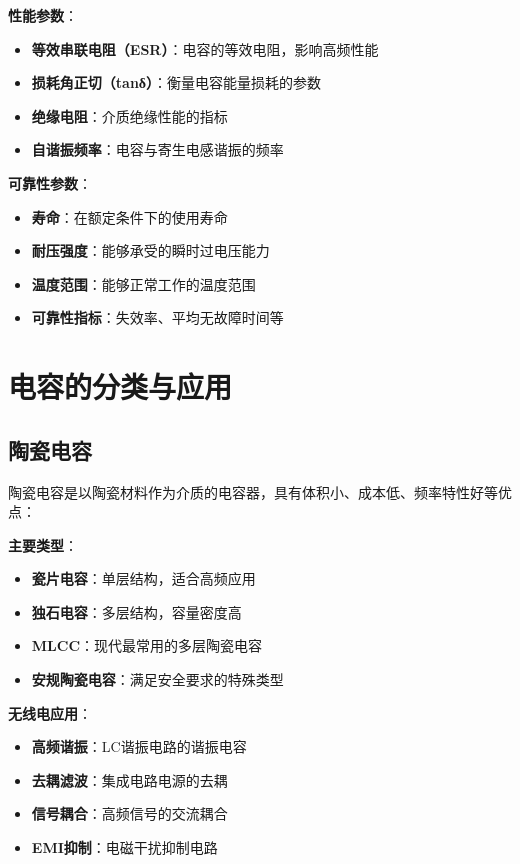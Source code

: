 \documentclass[12pt,UTF8]{ctexbook}
\begin{document}
\textbf{性能参数}：
\begin{itemize}[leftmargin=3.5em]
    \item \textbf{等效串联电阻（ESR）}：电容的等效电阻，影响高频性能
    \item \textbf{损耗角正切（tanδ）}：衡量电容能量损耗的参数
    \item \textbf{绝缘电阻}：介质绝缘性能的指标
    \item \textbf{自谐振频率}：电容与寄生电感谐振的频率
\end{itemize}

\textbf{可靠性参数}：
\begin{itemize}[leftmargin=3.5em]
    \item \textbf{寿命}：在额定条件下的使用寿命
    \item \textbf{耐压强度}：能够承受的瞬时过电压能力
    \item \textbf{温度范围}：能够正常工作的温度范围
    \item \textbf{可靠性指标}：失效率、平均无故障时间等
\end{itemize}

\section{电容的分类与应用}

\subsection{陶瓷电容}

陶瓷电容是以陶瓷材料作为介质的电容器，具有体积小、成本低、频率特性好等优点：

\textbf{主要类型}：
\begin{itemize}[leftmargin=3.5em]
    \item \textbf{瓷片电容}：单层结构，适合高频应用
    \item \textbf{独石电容}：多层结构，容量密度高
    \item \textbf{MLCC}：现代最常用的多层陶瓷电容
    \item \textbf{安规陶瓷电容}：满足安全要求的特殊类型
\end{itemize}

\textbf{无线电应用}：
\begin{itemize}[leftmargin=3.5em]
    \item \textbf{高频谐振}：LC谐振电路的谐振电容
    \item \textbf{去耦滤波}：集成电路电源的去耦
    \item \textbf{信号耦合}：高频信号的交流耦合
    \item \textbf{EMI抑制}：电磁干扰抑制电路
\end{itemize}
\end{document}
